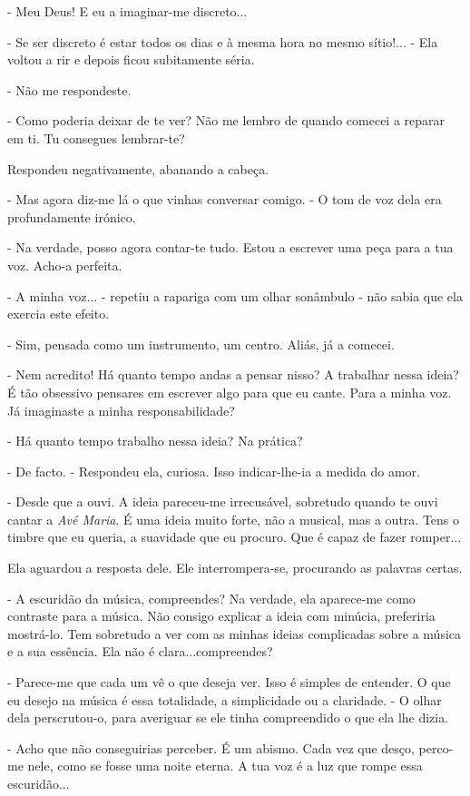 - Meu Deus! E eu a imaginar-me discreto...

- Se ser discreto é estar todos os dias e à mesma hora no mesmo
sítio!... - Ela voltou a rir e depois ficou subitamente séria.

- Não me respondeste.

- Como poderia deixar de te ver? Não me lembro de quando comecei a
reparar em ti. Tu consegues lembrar-te?

Respondeu negativamente, abanando a cabeça.

- Mas agora diz-me lá o que vinhas conversar comigo. - O tom de voz dela
era profundamente irónico.

- Na verdade, posso agora contar-te tudo. Estou a escrever uma peça para
a tua voz. Acho-a perfeita.

- A minha voz... - repetiu a rapariga com um olhar sonâmbulo - não sabia
que ela exercia este efeito.

- Sim, pensada como um instrumento, um centro. Aliás, já a comecei.

- Nem acredito! Há quanto tempo andas a pensar nisso? A trabalhar nessa
ideia? É tão obsessivo pensares em escrever algo para que eu cante. Para
a minha voz. Já imaginaste a minha responsabilidade?

- Há quanto tempo trabalho nessa ideia? Na prática?

- De facto. - Respondeu ela, curiosa. Isso indicar-lhe-ia a medida do
amor.

- Desde que a ouvi. A ideia pareceu-me irrecusável, sobretudo quando te
ouvi cantar a \emph{Avé Maria}. É uma ideia muito forte, não a musical,
mas a outra. Tens o timbre que eu queria, a suavidade que eu procuro.
Que é capaz de fazer romper...

Ela aguardou a resposta dele. Ele interrompera-se, procurando as
palavras certas.

- A escuridão da música, compreendes? Na verdade, ela aparece-me como
contraste para a música. Não consigo explicar a ideia com minúcia,
preferiria mostrá-lo. Tem sobretudo a ver com as minhas ideias
complicadas sobre a música e a sua essência. Ela não é
clara...compreendes?

- Parece-me que cada um vê o que deseja ver. Isso é simples de entender.
O que eu desejo na música é essa totalidade, a simplicidade ou a
claridade. - O olhar dela perscrutou-o, para averiguar se ele tinha
compreendido o que ela lhe dizia.

- Acho que não conseguirias perceber. É um abismo. Cada vez que desço,
perco-me nele, como se fosse uma noite eterna. A tua voz é a luz que
rompe essa escuridão...

